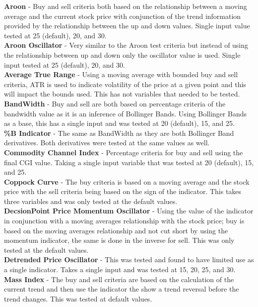 \documentclass[conference]{IEEEtran}
\begin{document}
\noindent
\textbf{Aroon} - Buy and sell criteria both based on the relationship between a moving average and the current stock price with conjunction of the trend information provided by the relationship between the up and down values. Single input value tested at 25 (default), 20, and 30.\\
\textbf{Aroon Oscillator} - Very similar to the Aroon test criteria but instead of using the relationship between up and down only the oscillator value is used. Single input tested at 25 (default), 20, and 30.\\
\textbf{Average True Range} - Using a moving average with bounded buy and sell criteria, ATR is used to indicate volatility of the price at a given point and this will impact the bounds used. This has not variables that needed to be tested. \\
\textbf{BandWidth} - Buy and sell are both based on percentage criteria of the bandwidth value as it is an inference of Bollinger Bands. Using Bollinger Bands as a base, this has a single input and was tested at 20 (default), 15, and 25.\\
\textbf{\%B Indicator} - The same as BandWidth as they are both Bollinger Band derivatives. Both derivatives were tested at the same values as well.\\
\textbf{Commodity Channel Index} - Percentage criteria for buy and sell using the final CGI value. Taking a single input variable that was tested at 20 (default), 15, and 25. \\
\textbf{Coppock Curve} - The buy criteria is based on a moving average and the stock price with the sell criteria being based on the sign of the indicator. This takes three variables and was only tested at the default values.\\
\textbf{DecsionPoint Price Momentum Oscillator} - Using the value of the indicator in conjunction with a moving averages relationship with the stock price; buy is based on the moving averages relationship and not cut short by using the momentum indicator, the same is done in the inverse for sell. This was only tested at the default values.\\
\textbf{Detrended Price Oscillator} - This was tested and found to have limited use as a single indicator. Takes a single input and was tested at 15, 20, 25, and 30.\\
\textbf{Mass Index} - The buy and sell criteria are based on the calculation of the current trend and then use the indicator the show a trend reversal before the trend changes. This was tested at default values.\\
\end{document}

